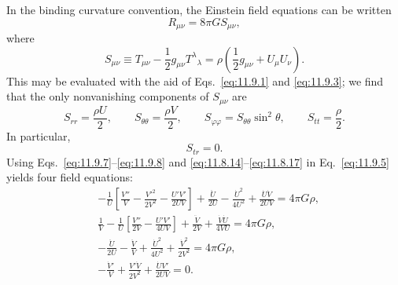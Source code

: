 In the binding curvature convention, the Einstein field equations can be
written
\begin{equation}
  R_{\mu\nu}=8\pi G S_{\mu\nu},
  \tag{11.9.5}\label{eq:11.9.5}
\end{equation}
where
\begin{equation}
  S_{\mu\nu}
  \equiv
  T_{\mu\nu}-\frac12g_{\mu\nu}T^\lambda{}_\lambda
  =
  \rho\left(\frac12g_{\mu\nu}+U_\mu U_\nu\right).
  \tag{11.9.6}\label{eq:11.9.6}
\end{equation}
This may be evaluated with the aid of Eqs.~\eqref{eq:11.9.1} and
\eqref{eq:11.9.3}; we find that the only nonvanishing components of
\(S_{\mu\nu}\) are
\begin{equation}
  S_{rr}=\frac{\rho U}{2},\qquad
  S_{\theta\theta}=\frac{\rho V}{2},\qquad
  S_{\varphi\varphi}=S_{\theta\theta}\sin^2\theta,\qquad
  S_{tt}=\frac{\rho}{2}.
  \tag{11.9.7}\label{eq:11.9.7}
\end{equation}
In particular,
\begin{equation}
  S_{tr}=0.
  \tag{11.9.8}\label{eq:11.9.8}
\end{equation}
Using Eqs.~\eqref{eq:11.9.7}--\eqref{eq:11.9.8} and
\eqref{eq:11.8.14}--\eqref{eq:11.8.17} in Eq.~\eqref{eq:11.9.5} yields
four field equations:
\begin{align}
  &-\frac1U
  \left[
    \frac{V''}{V}
    -\frac{V'^2}{2V^2}
    -\frac{U'V'}{2UV}
  \right]
  +\frac{\ddot U}{2U}
  -\frac{\dot U^2}{4U^2}
  +\frac{\dot U\dot V}{2UV}
  =4\pi G\rho,
  \tag{11.9.9}\label{eq:11.9.9}\\
  &\frac1V-\frac1U
  \left[
    \frac{V''}{2V}
    -\frac{U'V'}{4UV}
  \right]
  +\frac{\ddot V}{2V}
  +\frac{\dot V\dot U}{4VU}
  =4\pi G\rho,
  \tag{11.9.10}\label{eq:11.9.10}\\
  &-\frac{\ddot U}{2U}
  -\frac{\ddot V}{V}
  +\frac{\dot U^2}{4U^2}
  +\frac{\dot V^2}{2V^2}
  =4\pi G\rho,
  \tag{11.9.11}\label{eq:11.9.11}\\
  &-\frac{\dot V'}{V}
  +\frac{V'\dot V}{2V^2}
  +\frac{\dot U V'}{2UV}
  =0.
  \tag{11.9.12}\label{eq:11.9.12}
\end{align}

